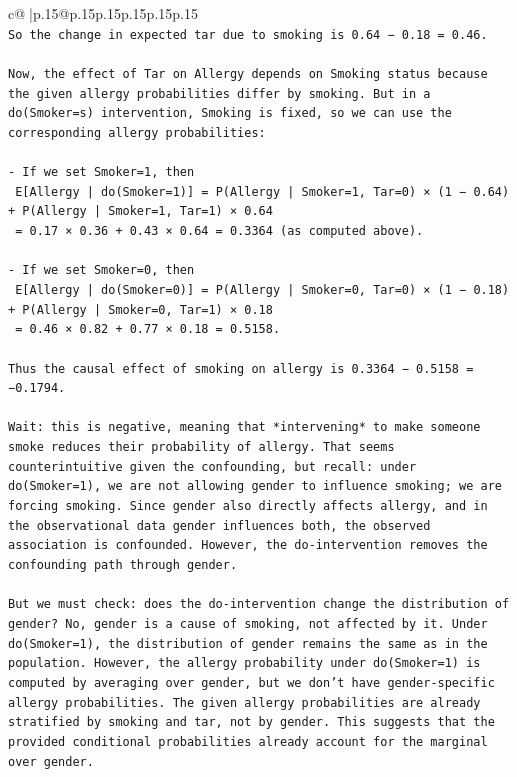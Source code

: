 \documentclass{article}
\begin{document}
{\begin{supertabular}{c@{$\;$}|p{.15\linewidth}@{}p{.15\linewidth}p{.15\linewidth}p{.15\linewidth}p{.15\linewidth}p{.15\linewidth}}
{{{\\ 
\texttt{So the change in expected tar due to smoking is 0.64 − 0.18 = 0.46.} \\
\\ 
\texttt{Now, the effect of Tar on Allergy depends on Smoking status because the given allergy probabilities differ by smoking. But in a do(Smoker=s) intervention, Smoking is fixed, so we can use the corresponding allergy probabilities:} \\
\\ 
\texttt{{-} If we set Smoker=1, then  } \\
\texttt{  E{[}Allergy | do(Smoker=1){]} = P(Allergy | Smoker=1, Tar=0) × (1 − 0.64) + P(Allergy | Smoker=1, Tar=1) × 0.64  } \\
\texttt{  = 0.17 × 0.36 + 0.43 × 0.64 = 0.3364 (as computed above).} \\
\\ 
\texttt{{-} If we set Smoker=0, then  } \\
\texttt{  E{[}Allergy | do(Smoker=0){]} = P(Allergy | Smoker=0, Tar=0) × (1 − 0.18) + P(Allergy | Smoker=0, Tar=1) × 0.18  } \\
\texttt{  = 0.46 × 0.82 + 0.77 × 0.18 = 0.5158.} \\
\\ 
\texttt{Thus the causal effect of smoking on allergy is 0.3364 − 0.5158 = −0.1794.} \\
\\ 
\texttt{Wait: this is negative, meaning that *intervening* to make someone smoke reduces their probability of allergy. That seems counterintuitive given the confounding, but recall: under do(Smoker=1), we are not allowing gender to influence smoking; we are forcing smoking. Since gender also directly affects allergy, and in the observational data gender influences both, the observed association is confounded. However, the do{-}intervention removes the confounding path through gender.} \\
\\ 
\texttt{But we must check: does the do{-}intervention change the distribution of gender? No, gender is a cause of smoking, not affected by it. Under do(Smoker=1), the distribution of gender remains the same as in the population. However, the allergy probability under do(Smoker=1) is computed by averaging over gender, but we don't have gender{-}specific allergy probabilities. The given allergy probabilities are already stratified by smoking and tar, not by gender. This suggests that the provided conditional probabilities already account for the marginal over gender.} \\
}}}
\end{supertabular}}
\end{document}
